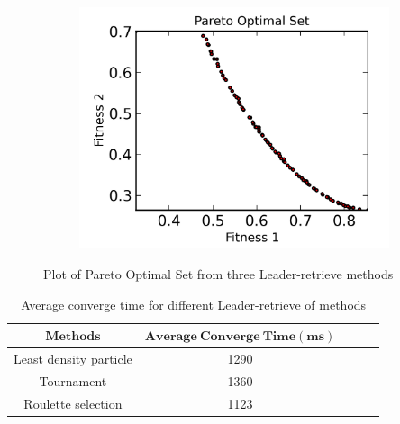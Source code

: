 \documentclass[11pt, runningheads,a4paper]{llncs}
\begin{document}
\begin{figure}
\begin{subfigure}[b]{0.3\textwidth}
                \label{fig:rb}
        \end{subfigure}
        \begin{subfigure}[b]{0.3\textwidth}
                \centering
                \includegraphics[width=\textwidth]{./figs/rolette.png}
                \label{fig:rc}
        \end{subfigure}
        \caption{Plot of Pareto Optimal Set from three Leader-retrieve methods}\label{fig:retrieve}
\end{figure}

\begin{table}
  \caption{Average converge time for different Leader-retrieve of methods}  
  \label{tab:compare1}
    \begin{center}
\begin{tabular}{c|cccc} 
\toprule 
	$\mathbf{Methods}$   & $\mathbf{Average\ Converge\ Time (ms)}$\\
	\hline Least density particle &  1290 \\ 
         Tournament & 1360 \\
         Roulette selection & 1123\\
\bottomrule 
\end{tabular} 
\end{center}
\end{table}
\end{document}
